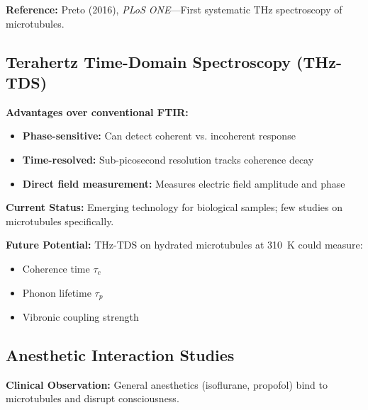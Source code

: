 \textbf{Reference:} Preto (2016), \textit{PLoS ONE}---First systematic THz spectroscopy of microtubules.

\subsection{Terahertz Time-Domain Spectroscopy (THz-TDS)}
\label{subsec:app-thz-tds}

\textbf{Advantages over conventional FTIR:}
\begin{itemize}
\item \textbf{Phase-sensitive:} Can detect coherent vs. incoherent response
\item \textbf{Time-resolved:} Sub-picosecond resolution tracks coherence decay
\item \textbf{Direct field measurement:} Measures electric field amplitude and phase
\end{itemize}

\textbf{Current Status:} Emerging technology for biological samples; few studies on microtubules specifically.

\textbf{Future Potential:} THz-TDS on hydrated microtubules at 310~K could measure:
\begin{itemize}
\item Coherence time $\tau_c$
\item Phonon lifetime $\tau_p$  
\item Vibronic coupling strength
\end{itemize}

\subsection{Anesthetic Interaction Studies}
\label{subsec:app-anesthetics}

\textbf{Clinical Observation:} General anesthetics (isoflurane, propofol) bind to microtubules and disrupt consciousness.

